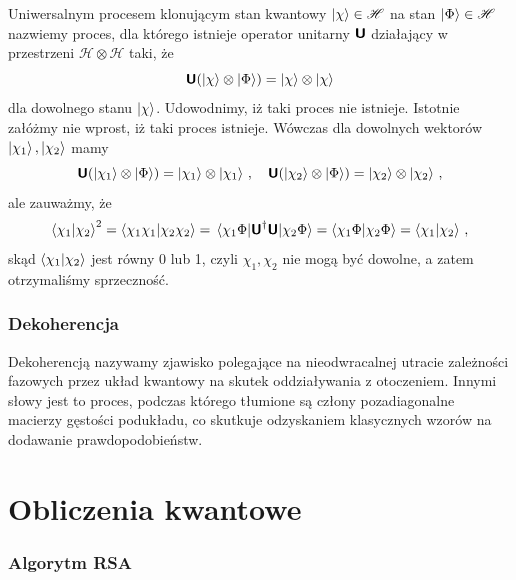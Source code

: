 \documentclass{myclass}
\begin{document}
Uniwersalnym procesem klonującym stan kwantowy \(\ket{\chi}\in\mathscr{H}\) na stan
\(\ket{\Phi}\in\mathscr{H}\) nazwiemy proces, dla którego istnieje operator unitarny \(\boldsymbol{\mathsf{U}}\)
działający w przestrzeni \(\mathscr{H}\otimes\mathscr{H}\) taki, że
\begin{equation*}
    \boldsymbol{\mathsf{U}}(\ket{\chi}\otimes\ket{\Phi}) = \ket{\chi}\otimes\ket{\chi}
\end{equation*}
dla dowolnego stanu \(\ket{\chi}\). Udowodnimy, iż taki proces nie istnieje. Istotnie załóżmy nie
wprost, iż taki proces istnieje. Wówczas dla dowolnych wektorów \(\ket{\chi_1}, \ket{\chi_2}\) mamy
\begin{equation*}
    \boldsymbol{\mathsf{U}}(\ket{\chi_1}\otimes\ket{\Phi}) = \ket{\chi_1}\otimes\ket{\chi_1}\,,\quad \boldsymbol{\mathsf{U}}(\ket{\chi_2}\otimes\ket{\Phi}) = \ket{\chi_2}\otimes\ket{\chi_2}\,,
\end{equation*}
ale zauważmy, że
\begin{equation*}
     \braket{\chi_1}{\chi_2}^2 = \braket{\chi_1\chi_1}{\chi_2\chi_2} = \mel{\chi_1\Phi}{\boldsymbol{\mathsf{U}}^\dagger\boldsymbol{\mathsf{U}}}{\chi_2\Phi} = \braket{\chi_1\Phi}{\chi_2\Phi} = \braket{\chi_1}{\chi_2}\,,
\end{equation*}
skąd \(\braket{\chi_1}{\chi_2}\) jest równy 0 lub 1, czyli \(\chi_1, \chi_2\) nie mogą być dowolne,
a zatem otrzymaliśmy sprzeczność.

\subsubsection{Dekoherencja}

Dekoherencją nazywamy zjawisko polegające na nieodwracalnej utracie zależności fazowych przez układ
kwantowy na skutek oddziaływania z otoczeniem. Innymi słowy jest to proces, podczas którego tłumione
są człony pozadiagonalne macierzy gęstości podukładu, co skutkuje odzyskaniem klasycznych wzorów na
dodawanie prawdopodobieństw.












\section{Obliczenia kwantowe}

\subsubsection*{Algorytm RSA}
\end{document}

